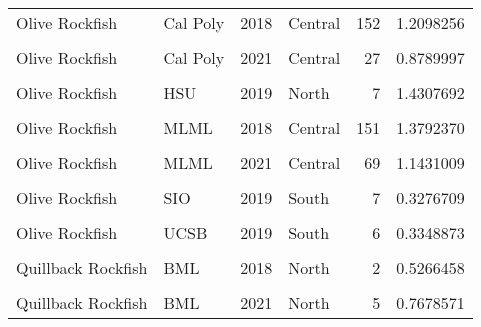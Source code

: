 \documentclass[
]{article}
\begin{document}
\begin{longtable}[t]{llrlrr}
Olive Rockfish & Cal Poly & 2018 & Central & 152 & 1.2098256\\
\cellcolor{gray!6}{Olive Rockfish} & \cellcolor{gray!6}{Cal Poly} & \cellcolor{gray!6}{2019} & \cellcolor{gray!6}{Central} & \cellcolor{gray!6}{183} & \cellcolor{gray!6}{1.8592599}\\
\addlinespace
Olive Rockfish & Cal Poly & 2021 & Central & 27 & 0.8789997\\
\cellcolor{gray!6}{Olive Rockfish} & \cellcolor{gray!6}{HSU} & \cellcolor{gray!6}{2018} & \cellcolor{gray!6}{North} & \cellcolor{gray!6}{14} & \cellcolor{gray!6}{1.2547269}\\
Olive Rockfish & HSU & 2019 & North & 7 & 1.4307692\\
\cellcolor{gray!6}{Olive Rockfish} & \cellcolor{gray!6}{HSU} & \cellcolor{gray!6}{2021} & \cellcolor{gray!6}{North} & \cellcolor{gray!6}{14} & \cellcolor{gray!6}{2.1862810}\\
Olive Rockfish & MLML & 2018 & Central & 151 & 1.3792370\\
\addlinespace
\cellcolor{gray!6}{Olive Rockfish} & \cellcolor{gray!6}{MLML} & \cellcolor{gray!6}{2019} & \cellcolor{gray!6}{Central} & \cellcolor{gray!6}{127} & \cellcolor{gray!6}{1.1693979}\\
Olive Rockfish & MLML & 2021 & Central & 69 & 1.1431009\\
\cellcolor{gray!6}{Olive Rockfish} & \cellcolor{gray!6}{SIO} & \cellcolor{gray!6}{2018} & \cellcolor{gray!6}{South} & \cellcolor{gray!6}{2} & \cellcolor{gray!6}{0.6593407}\\
Olive Rockfish & SIO & 2019 & South & 7 & 0.3276709\\
\cellcolor{gray!6}{Olive Rockfish} & \cellcolor{gray!6}{SIO} & \cellcolor{gray!6}{2021} & \cellcolor{gray!6}{South} & \cellcolor{gray!6}{5} & \cellcolor{gray!6}{0.9801865}\\
\addlinespace
Olive Rockfish & UCSB & 2019 & South & 6 & 0.3348873\\
\cellcolor{gray!6}{Olive Rockfish} & \cellcolor{gray!6}{UCSB} & \cellcolor{gray!6}{2021} & \cellcolor{gray!6}{South} & \cellcolor{gray!6}{4} & \cellcolor{gray!6}{0.3790099}\\
Quillback Rockfish & BML & 2018 & North & 2 & 0.5266458\\
\cellcolor{gray!6}{Quillback Rockfish} & \cellcolor{gray!6}{BML} & \cellcolor{gray!6}{2019} & \cellcolor{gray!6}{North} & \cellcolor{gray!6}{1} & \cellcolor{gray!6}{0.3333333}\\
Quillback Rockfish & BML & 2021 & North & 5 & 0.7678571\\

\end{longtable}
\end{document}
